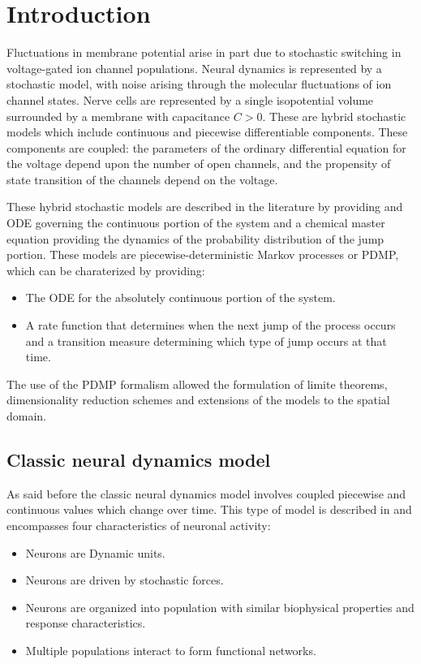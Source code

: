 \section{Introduction}
Fluctuations in membrane potential arise in part due to stochastic switching in voltage-gated ion channel populations.
Neural dynamics is represented by a stochastic model, with noise arising through the molecular fluctuations of ion channel states.
Nerve cells are represented by a single isopotential volume surrounded by a membrane with capacitance $C>0$.
These are hybrid stochastic models which include continuous and piecewise differentiable components.
These components are coupled: the parameters of the ordinary differential equation for the voltage depend upon the number of open channels, and the propensity of state transition of the channels depend on the voltage.

These hybrid stochastic models are described in the literature by providing and ODE governing the continuous portion of the system and a chemical master equation providing the dynamics of the probability distribution of the jump portion.
These models are piecewise-deterministic Markov processes or PDMP, which can be charaterized by providing:

\begin{itemize}
	\item The ODE for the absolutely continuous portion of the system.
	\item A rate function that determines when the next jump of the process occurs and a transition measure determining which type of jump occurs at that time.
\end{itemize}

The use of the PDMP formalism allowed the formulation of limite theorems, dimensionality reduction schemes and extensions of the models to the spatial domain.

	\subsection{Classic neural dynamics model}
	As said before the classic neural dynamics model involves coupled piecewise and continuous values which change over time.
	This type of model is described in \cite{stochastic-neuron} and encompasses four characteristics of neuronal activity:

	\begin{itemize}
		\item Neurons are Dynamic units.
		\item Neurons are driven by stochastic forces.
		\item Neurons are organized into population with similar biophysical properties and response characteristics.
		\item Multiple populations interact to form functional networks.
	\end{itemize}

